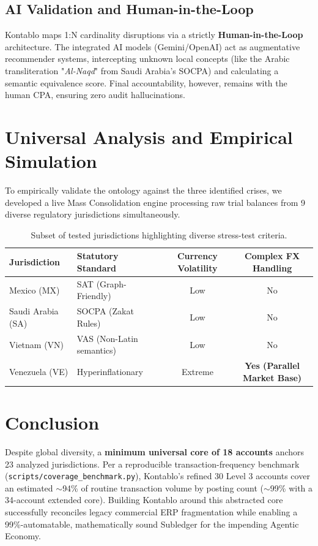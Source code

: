 \documentclass[12pt]{article}
\begin{document}
\subsection{AI Validation and Human-in-the-Loop}
Kontablo maps 1:N cardinality disruptions via a strictly \textbf{Human-in-the-Loop} architecture. The integrated AI models (Gemini/OpenAI) act as augmentative recommender systems, intercepting unknown local concepts (like the Arabic transliteration "\textit{Al-Naqd}" from Saudi Arabia's SOCPA) and calculating a semantic equivalence score. Final accountability, however, remains with the human CPA, ensuring zero audit hallucinations.

\section{Universal Analysis and Empirical Simulation}

To empirically validate the ontology against the three identified crises, we developed a live Mass Consolidation engine processing raw trial balances from 9 diverse regulatory jurisdictions simultaneously. 

\begin{table}[ht]
\centering
\begin{tabular}{@{}llcc@{}}
\toprule
\textbf{Jurisdiction} & \textbf{Statutory Standard} & \textbf{Currency Volatility} & \textbf{Complex FX Handling} \\ \midrule
Mexico (MX) & SAT (Graph-Friendly) & Low & No \\
Saudi Arabia (SA) & SOCPA (Zakat Rules) & Low & No \\
Vietnam (VN) & VAS (Non-Latin semantics) & Low & No \\
Venezuela (VE) & Hyperinflationary & Extreme & \textbf{Yes (Parallel Market Base)} \\ \bottomrule
\end{tabular}
\caption{Subset of tested jurisdictions highlighting diverse stress-test criteria.}
\label{tab:simulation}
\end{table}

\section{Conclusion}
Despite global diversity, a \textbf{minimum universal core of 18 accounts} anchors 23 analyzed jurisdictions. Per a reproducible transaction-frequency benchmark (\texttt{scripts/coverage\_benchmark.py}), Kontablo's refined 30 Level 3 accounts cover an estimated $\sim$94\% of routine transaction volume by posting count ($\sim$99\% with a 34-account extended core). Building Kontablo around this abstracted core successfully reconciles legacy commercial ERP fragmentation while enabling a 99\%-automatable, mathematically sound Subledger for the impending Agentic Economy.
\end{document}
